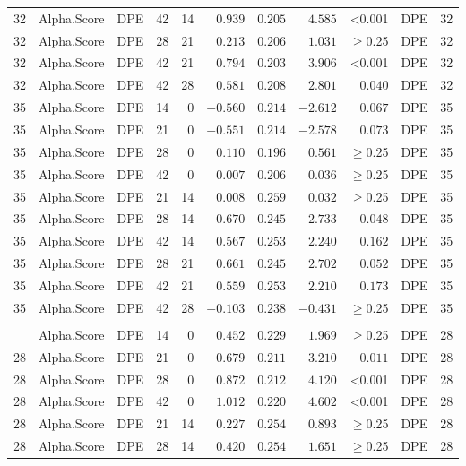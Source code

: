 \documentclass[
]{article}
\begin{document}
\begin{longtable}{cllrrrrrrlc}
32 & Alpha.Score & DPE & 42 & 14 & $0.939$ & $0.205$ & $4.585$ & <0.001 & DPE & 32 \\ 
32 & Alpha.Score & DPE & 28 & 21 & $0.213$ & $0.206$ & $1.031$ & $\geq$0.25 & DPE & 32 \\ 
32 & Alpha.Score & DPE & 42 & 21 & $0.794$ & $0.203$ & $3.906$ & <0.001 & DPE & 32 \\ 
32 & Alpha.Score & DPE & 42 & 28 & $0.581$ & $0.208$ & $2.801$ & $0.040$ & DPE & 32 \\ 
35 & Alpha.Score & DPE & 14 & 0 & $-0.560$ & $0.214$ & $-2.612$ & $0.067$ & DPE & 35 \\ 
35 & Alpha.Score & DPE & 21 & 0 & $-0.551$ & $0.214$ & $-2.578$ & $0.073$ & DPE & 35 \\ 
35 & Alpha.Score & DPE & 28 & 0 & $0.110$ & $0.196$ & $0.561$ & $\geq$0.25 & DPE & 35 \\ 
35 & Alpha.Score & DPE & 42 & 0 & $0.007$ & $0.206$ & $0.036$ & $\geq$0.25 & DPE & 35 \\ 
35 & Alpha.Score & DPE & 21 & 14 & $0.008$ & $0.259$ & $0.032$ & $\geq$0.25 & DPE & 35 \\ 
35 & Alpha.Score & DPE & 28 & 14 & $0.670$ & $0.245$ & $2.733$ & $0.048$ & DPE & 35 \\ 
35 & Alpha.Score & DPE & 42 & 14 & $0.567$ & $0.253$ & $2.240$ & $0.162$ & DPE & 35 \\ 
35 & Alpha.Score & DPE & 28 & 21 & $0.661$ & $0.245$ & $2.702$ & $0.052$ & DPE & 35 \\ 
35 & Alpha.Score & DPE & 42 & 21 & $0.559$ & $0.253$ & $2.210$ & $0.173$ & DPE & 35 \\ 
35 & Alpha.Score & DPE & 42 & 28 & $-0.103$ & $0.238$ & $-0.431$ & $\geq$0.25 & DPE & 35 \\ 
\midrule\addlinespace[2.5pt]
\multicolumn{11}{l}{Phylogenetic} \\ 
\midrule\addlinespace[2.5pt]
28 & Alpha.Score & DPE & 14 & 0 & $0.452$ & $0.229$ & $1.969$ & $\geq$0.25 & DPE & 28 \\ 
28 & Alpha.Score & DPE & 21 & 0 & $0.679$ & $0.211$ & $3.210$ & $0.011$ & DPE & 28 \\ 
28 & Alpha.Score & DPE & 28 & 0 & $0.872$ & $0.212$ & $4.120$ & <0.001 & DPE & 28 \\ 
28 & Alpha.Score & DPE & 42 & 0 & $1.012$ & $0.220$ & $4.602$ & <0.001 & DPE & 28 \\ 
28 & Alpha.Score & DPE & 21 & 14 & $0.227$ & $0.254$ & $0.893$ & $\geq$0.25 & DPE & 28 \\ 
28 & Alpha.Score & DPE & 28 & 14 & $0.420$ & $0.254$ & $1.651$ & $\geq$0.25 & DPE & 28 \\ 

\end{longtable}
\end{document}

